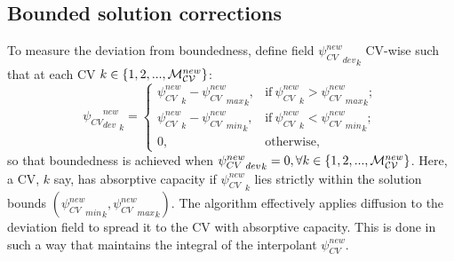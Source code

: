 \subsection{Bounded solution corrections}
\label{Bounded solution corrections}
To measure the deviation from boundedness, define
field ${{\psi_{CV}^{new}}_{dev}}_k$ CV-wise such that at each CV $k\in\{1,2,...,{\cal M}^{new}_{\cal CV}\}$:
\begin{equation}
{{\psi_{CV}}^{new}_{dev}}_k=
  \begin{cases}
    {\psi_{CV}^{new}}_k - {{\psi_{CV}^{new}}_{max}}_k, & \text{if} \
    {\psi_{CV}^{new}}_k> {{\psi_{CV}^{new}}_{max}}_k; \\
    {\psi_{CV}^{new}}_k -{{\psi_{CV}^{new}}_{min}}_k, & \text{if} \
    {\psi_{CV}^{new}}_k< {{\psi_{CV}^{new}}_{min}}_k; \\
    0,  & \text{otherwise},
  \end{cases}
\label{q_dev}
\end{equation}
so that boundedness is achieved when ${{\psi_{CV}^{new}}_{dev}}_k=0, \forall k\in\{1,2,...,{\cal M}^{new}_{\cal CV}\}$. Here,
a CV, $k$ say, has absorptive capacity if ${{\psi_{CV}^{new}}}_k$
lies strictly within the solution bounds $({{\psi_{CV}^{new}}_{min}}_k,{{\psi_{CV}^{new}}_{max}}_k)$.
The algorithm effectively applies diffusion to the deviation field to
spread it to the CV with absorptive capacity. This is done in such a
way that maintains the integral of the interpolant ${\psi_{CV}^{new}}$.

